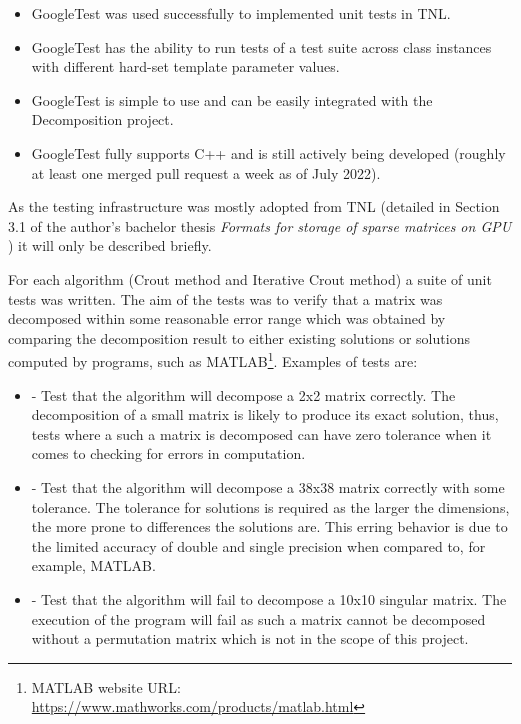 \begin{itemize}
	\item GoogleTest was used successfully to implemented unit tests in TNL.
	\item GoogleTest has the ability to run tests of a test suite across class instances with different hard-set template parameter values.
	\item GoogleTest is simple to use and can be easily integrated with the Decomposition project.
	\item GoogleTest fully supports C++ and is still actively being developed (roughly at least one merged pull request a week as of July 2022).
\end{itemize}

As the testing infrastructure was mostly adopted from TNL (detailed in Section 3.1 of the author's bachelor thesis \textit{Formats for storage of sparse matrices on GPU} \cite{Cejka2020}) it will only be described briefly.

\par For each algorithm (Crout method and Iterative Crout method) a suite of unit tests was written. The aim of the tests was to verify that a matrix was decomposed within some reasonable error range which was obtained by comparing the decomposition result to either existing solutions or solutions computed by programs, such as MATLAB\footnote{MATLAB website URL: \url{https://www.mathworks.com/products/matlab.html}}. Examples of tests are:

\begin{itemize}
	\item {} - Test that the algorithm will decompose a 2x2 matrix correctly. The decomposition of a small matrix is likely to produce its exact solution, thus, tests where a such a matrix is decomposed can have zero tolerance when it comes to checking for errors in computation.
	\item {} - Test that the algorithm will decompose a 38x38 matrix correctly with some tolerance. The tolerance for solutions is required as the larger the dimensions, the more prone to differences the solutions are. This erring behavior is due to the limited accuracy of double and single precision when compared to, for example, MATLAB.
	\item {} - Test that the algorithm will fail to decompose a 10x10 singular matrix. The execution of the program will fail as such a matrix cannot be decomposed without a permutation matrix which is not in the scope of this project.
\end{itemize}

